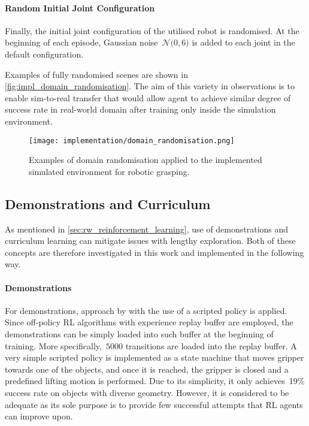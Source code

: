 \paragraph{Random Initial Joint Configuration} Finally, the initial joint configuration of the utilised robot is randomised. At the beginning of each episode, Gaussian noise~\(\mathcal{N}(0, 6\)\textdegree\()\) is added to each joint in the default configuration.

\bigskip

Examples of fully randomised scenes are shown in \autoref{fig:impl_domain_randomisation}. The aim of this variety in observations is to enable sim-to-real transfer that would allow agent to achieve similar degree of success rate in real-world domain after training only inside the simulation environment.

\begin{figure}[ht]
    \centering
    \texttt{[image: implementation/domain\_randomisation.png]}
    \caption{Examples of domain randomisation applied to the implemented simulated environment for robotic grasping.}
    \label{fig:impl_domain_randomisation}
\end{figure}


\subsection{Demonstrations and Curriculum}

As mentioned in \autoref{sec:rw_reinforcement_learning}, use of demonstrations and curriculum learning can mitigate issues with lengthy exploration. Both of these concepts are therefore investigated in this work and implemented in the following way.

\paragraph{Demonstrations} For demonstrations, approach by \citet{kalashnikov_qt-opt_2018} with the use of a scripted policy is applied. Since off-policy RL algorithms with experience replay buffer are employed, the demonstrations can be simply loaded into such buffer at the beginning of training. More specifically,~\(5000\) transitions are loaded into the replay buffer. A very simple scripted policy is implemented as a state machine that moves gripper towards one of the objects, and once it is reached, the gripper is closed and a predefined lifting motion is performed. Due to its simplicity, it only achieves~19\% success rate on objects with diverse geometry. However, it is considered to be adequate as its sole purpose is to provide few successful attempts that RL agents can improve upon.

